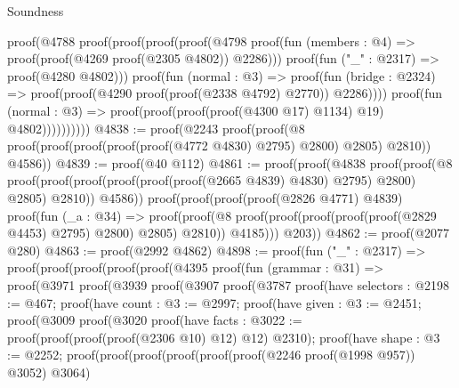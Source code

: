 \begin{lexlean}{Soundness}
\begin{coremodule}
                        proof(@4788
                            proof(proof(proof(proof(@4798
                                      proof(fun (members : @4) =>
                                        proof(proof(@4269 proof(@2305 @4802)) @2286)))
                                    proof(fun ("_" : @2317) => proof(@4280 @4802)))
                                  proof(fun (normal : @3) =>
                                    proof(fun (bridge : @2324) =>
                                      proof(proof(@4290 proof(proof(@2338 @4792) @2770)) @2286))))
                                proof(fun (normal : @3) =>
                                  proof(proof(proof(proof(@4300 @17) @1134) @19) @4802))))))))))
@4838 := proof(@2243
      proof(proof(@8 proof(proof(proof(proof(proof(@4772 @4830) @2795) @2800) @2805) @2810)) @4586))
@4839 := proof(@40 @112)
@4861 := proof(proof(@4838
        proof(proof(@8
              proof(proof(proof(proof(proof(proof(@2665 @4839) @4830) @2795) @2800) @2805) @2810))
            @4586))
      proof(proof(proof(proof(@2826 @4771) @4839)
            proof(fun (_a : @34) =>
              proof(proof(@8 proof(proof(proof(proof(proof(@2829 @4453) @2795) @2800) @2805) @2810))
                  @4185)))
          @203))
@4862 := proof(@2077 @280)
@4863 := proof(@2992 @4862)
@4898 := proof(fun ("_" : @2317) =>
    proof(proof(proof(proof(proof(@4395
                proof(fun (grammar : @31) =>
                  proof(@3971
                      proof(@3939
                          proof(@3907
                              proof(@3787
                                  proof(have selectors : @2198 := @467;
                                    proof(have count : @3 := @2997;
                                      proof(have given : @3 := @2451;
                                        proof(@3009
                                            proof(@3020
                                                proof(have facts : @3022 := proof(proof(proof(proof(@2306
                                                            @10)
                                                          @12)
                                                        @12)
                                                      @2310);
                                                  proof(have shape : @3 := @2252;
                                                    proof(proof(proof(proof(proof(proof(@2246
                                                                  proof(@1998 @957))
                                                                @3052)
                                                              @3064)

\end{coremodule}
\end{lexlean}
